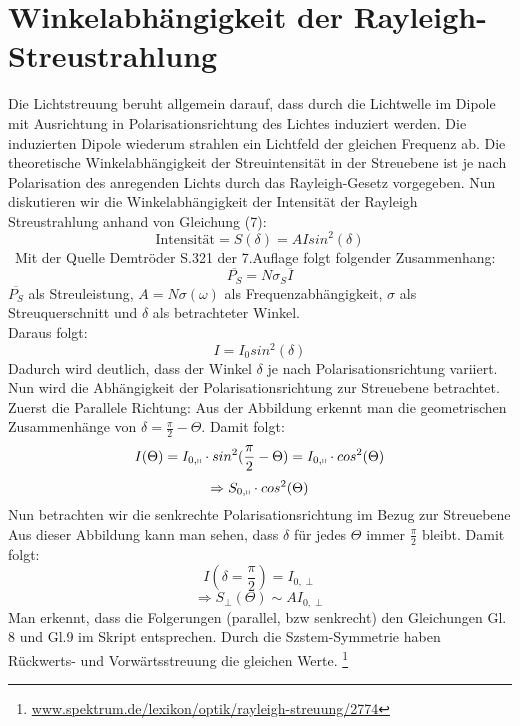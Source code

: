 \section{Winkelabhängigkeit der Rayleigh-Streustrahlung}
Die Lichtstreuung beruht allgemein darauf, dass durch die Lichtwelle im Dipole mit Ausrichtung in Polarisationsrichtung des Lichtes induziert werden. Die induzierten Dipole wiederum strahlen ein Lichtfeld der gleichen Frequenz ab. Die theoretische Winkelabhängigkeit der Streuintensität in der Streuebene ist je nach Polarisation des anregenden Lichts durch das Rayleigh-Gesetz vorgegeben. 
Nun diskutieren wir die Winkelabhängigkeit der Intensität der Rayleigh Streustrahlung anhand von Gleichung (7): 
\begin{equation}
    \text{Intensität} = S(\delta)=AIsin^2(\delta)
\end{equation}\
Mit der Quelle Demtröder S.321 der 7.Auflage folgt folgender Zusammenhang:
\begin{equation}
\overline{P_S}=N\sigma_S \overline{I}
\end{equation}
$\overline{P_S}$ als Streuleistung, $A=N\sigma(\omega)$ als Frequenzabhängigkeit, $\sigma$ als Streuquerschnitt und $\delta$ als betrachteter Winkel.\\
Daraus folgt:
\begin{equation}
I=I_0 sin^2(\delta)
\end{equation}
Dadurch wird deutlich, dass der Winkel $\delta$ je nach Polarisationsrichtung variiert. \\
Nun wird die Abhängigkeit der Polarisationsrichtung zur Streuebene betrachtet. 
Zuerst die Parallele Richtung:
Aus der Abbildung erkennt man die geometrischen Zusammenhänge von $\delta=\frac{\pi}{2}-\Theta$. Damit folgt:
\begin{equation}
I(\Theta)=I_{0,\shortparallel}\cdot sin^2 (\frac{\pi}{2}-\Theta)=I_{0,\shortparallel}\cdot cos^2(\Theta)
\end{equation}
\begin{equation}
\Rightarrow S_{0,\shortparallel}\cdot cos^2(\Theta)
\end{equation}
Nun betrachten wir die senkrechte Polarisationsrichtung im Bezug zur Streuebene
Aus dieser Abbildung kann man sehen, dass $\delta$ für jedes $\Theta$ immer $\frac{\pi}{2}$ bleibt. Damit folgt:
\begin{equation}
I(\delta=\frac{\pi}{2}) = I_{0,\perp}
\end{equation}
\begin{equation}
\Rightarrow S_\perp (\Theta) \sim AI_{0,\perp}
\end{equation}
Man erkennt, dass die Folgerungen (parallel, bzw senkrecht) den Gleichungen Gl. 8 und Gl.9 im Skript entsprechen. 
Durch die Szstem-Symmetrie haben Rückwerts- und Vorwärtsstreuung die gleichen Werte.
\footnote{\url{www.spektrum.de/lexikon/optik/rayleigh-streuung/2774}}

